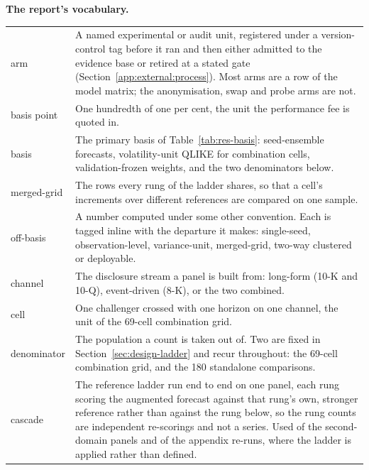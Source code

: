 \vspace{3mm}
\noindent\textbf{The report's vocabulary.}
\par\nobreak
\vspace{1mm}
{\small\singlespacing
\noindent\begin{tabular}{@{}>{\raggedright\arraybackslash}p{}>{\raggedright\arraybackslash}p{}@{}}
\toprule
arm & A named experimental or audit unit, registered under a version-control tag before it ran and then either admitted to the evidence base or retired at a stated gate (Section~\ref{app:external:process}). Most arms are a row of the model matrix; the anonymisation, swap and probe arms are not. \\
basis point & One hundredth of one per cent, the unit the performance fee is quoted in. \\
basis & The primary basis of Table~\ref{tab:res-basis}: seed-ensemble forecasts, volatility-unit QLIKE for combination cells, validation-frozen weights, and the two denominators below. \\
merged-grid & The rows every rung of the ladder shares, so that a cell's increments over different references are compared on one sample. \\
off-basis & A number computed under some other convention. Each is tagged inline with the departure it makes: single-seed, observation-level, variance-unit, merged-grid, two-way clustered or deployable. \\
channel & The disclosure stream a panel is built from: long-form (10-K and 10-Q), event-driven (8-K), or the two combined. \\
cell & One challenger crossed with one horizon on one channel, the unit of the 69-cell combination grid. \\
denominator & The population a count is taken out of. Two are fixed in Section~\ref{sec:design-ladder} and recur throughout: the 69-cell combination grid, and the 180 standalone comparisons. \\
cascade & The reference ladder run end to end on one panel, each rung scoring the augmented forecast against that rung's own, stronger reference rather than against the rung below, so the rung counts are independent re-scorings and not a series. Used of the second-domain panels and of the appendix re-runs, where the ladder is applied rather than defined. \\

\end{tabular}}
